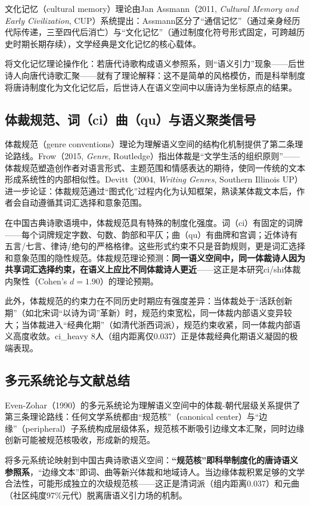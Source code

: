 \documentclass[12pt,a4paper]{article}
\numberwithin{equation}{section}
\begin{document}
文化记忆（cultural memory）理论由Jan Assmann（2011, \textit{Cultural Memory and Early Civilization}, CUP）系统提出：Assmann区分了“通信记忆”（通过亲身经历代际传递，三至四代后消亡）与“文化记忆”（通过制度化符号形式固定，可跨越历史时期长期存续），文学经典是文化记忆的核心载体。

将文化记忆理论操作化：若唐代诗歌构成语义参照系，则“语义引力”现象——后世诗人向唐代诗歌汇聚——就有了理论解释：这不是简单的风格模仿，而是科举制度将唐诗制度化为文化记忆后，后世诗人在语义空间中以唐诗为坐标原点的结果。

\subsection{体裁规范、词（ci）曲（qu）与语义聚类信号}

体裁规范（genre conventions）理论为理解语义空间的结构化机制提供了第二条理论路线。Frow（2015, \textit{Genre}, Routledge）指出体裁是“文学生活的组织原则”——体裁规范塑造创作者对语言形式、主题范围和情感表达的期待，使同一传统的文本形成系统性的内部相似性。Devitt（2004, \textit{Writing Genres}, Southern Illinois UP）进一步论证：体裁规范通过“图式化”过程内化为认知框架，熟读某体裁文本后，作者会自动遵循其词汇选择和意象范围。

在中国古典诗歌语境中，体裁规范具有特殊的制度化强度。词（ci）有固定的词牌——每个词牌规定字数、句数、韵部和平仄；曲（qu）有曲牌和宫调；近体诗有五言/七言、律诗/绝句的严格格律。这些形式约束不只是音韵规则，更是词汇选择和意象范围的隐性规范。体裁规范理论预测：\textbf{同一语义空间中，同一体裁诗人因为共享词汇选择约束，在语义上应比不同体裁诗人更近}——这正是本研究ci/shi体裁内聚性（Cohen's $d=1.90$）的理论预期。

此外，体裁规范的约束力在不同历史时期应有强度差异：当体裁处于“活跃创新期”（如北宋词“以诗为词”革新）时，规范约束宽松，同一体裁内部语义变异较大；当体裁进入“经典化期”（如清代浙西词派），规范约束收紧，同一体裁内部语义高度收敛。ci\_heavy 8人（组内距离仅0.037）正是体裁经典化期语义凝固的极端表现。

\subsection{多元系统论与文献总结}

Even-Zohar（1990）的多元系统论为理解语义空间中的体裁-朝代层级关系提供了第三条理论路线：任何文学系统都由“规范核”（canonical center）与“边缘”（peripheral）子系统构成层级体系，规范核不断吸引边缘文本汇聚，同时边缘创新可能被规范核吸收，形成新的规范。

将多元系统论映射到中国古典诗歌语义空间：\textbf{“规范核”即科举制度化的唐诗语义参照系}，“边缘文本”即词、曲等新兴体裁和地域诗人。当边缘体裁积累足够的文学合法性，可能形成独立的次级规范核——这正是清词派（组内距离0.037）和元曲（社区纯度97\%元代）脱离唐语义引力场的机制。
\end{document}
